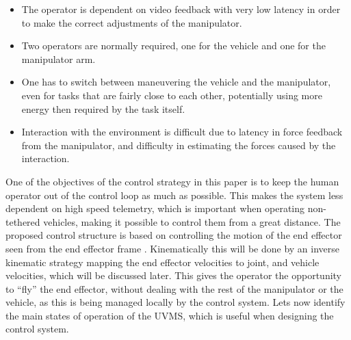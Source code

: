 \begin{itemize}
	\item The operator is dependent on video feedback with very low latency in order to make the correct adjustments of the manipulator.  
	\item Two operators are normally required, one for the vehicle and one for the manipulator arm.
	\item One has to switch between maneuvering the vehicle and the manipulator, even for tasks that are fairly close to each other, potentially using more energy then required by the task itself. 
	\item Interaction with the environment is difficult due to latency in force feedback from the manipulator, and difficulty in estimating the forces caused by the interaction.
\end{itemize}
One of the objectives of the control strategy in this paper is to keep the human operator out of the control loop as much as possible. This makes the system less dependent on high speed telemetry, which is important when operating non-tethered vehicles, making it possible to control them from a great distance. 
The proposed control structure is based on controlling the motion of the end effector seen from the end effector frame . Kinematically this will be done by an inverse kinematic strategy mapping the end effector velocities 
to joint, and vehicle velocities, which will be discussed later. This gives the operator the opportunity to ``fly'' the end effector, without dealing with the rest of the manipulator or the vehicle, as this is being managed locally by the control system. 
Lets now identify the main states of operation of the UVMS, which is useful when designing the control system. 

